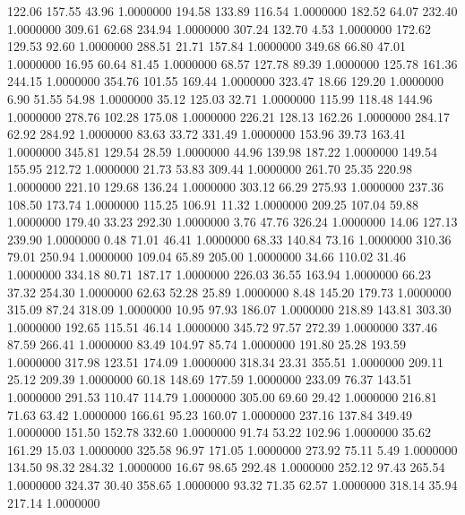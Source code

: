  122.06  157.55   43.96   1.0000000
 194.58  133.89  116.54   1.0000000
 182.52   64.07  232.40   1.0000000
 309.61   62.68  234.94   1.0000000
 307.24  132.70    4.53   1.0000000
 172.62  129.53   92.60   1.0000000
 288.51   21.71  157.84   1.0000000
 349.68   66.80   47.01   1.0000000
  16.95   60.64   81.45   1.0000000
  68.57  127.78   89.39   1.0000000
 125.78  161.36  244.15   1.0000000
 354.76  101.55  169.44   1.0000000
 323.47   18.66  129.20   1.0000000
   6.90   51.55   54.98   1.0000000
  35.12  125.03   32.71   1.0000000
 115.99  118.48  144.96   1.0000000
 278.76  102.28  175.08   1.0000000
 226.21  128.13  162.26   1.0000000
 284.17   62.92  284.92   1.0000000
  83.63   33.72  331.49   1.0000000
 153.96   39.73  163.41   1.0000000
 345.81  129.54   28.59   1.0000000
  44.96  139.98  187.22   1.0000000
 149.54  155.95  212.72   1.0000000
  21.73   53.83  309.44   1.0000000
 261.70   25.35  220.98   1.0000000
 221.10  129.68  136.24   1.0000000
 303.12   66.29  275.93   1.0000000
 237.36  108.50  173.74   1.0000000
 115.25  106.91   11.32   1.0000000
 209.25  107.04   59.88   1.0000000
 179.40   33.23  292.30   1.0000000
   3.76   47.76  326.24   1.0000000
  14.06  127.13  239.90   1.0000000
   0.48   71.01   46.41   1.0000000
  68.33  140.84   73.16   1.0000000
 310.36   79.01  250.94   1.0000000
 109.04   65.89  205.00   1.0000000
  34.66  110.02   31.46   1.0000000
 334.18   80.71  187.17   1.0000000
 226.03   36.55  163.94   1.0000000
  66.23   37.32  254.30   1.0000000
  62.63   52.28   25.89   1.0000000
   8.48  145.20  179.73   1.0000000
 315.09   87.24  318.09   1.0000000
  10.95   97.93  186.07   1.0000000
 218.89  143.81  303.30   1.0000000
 192.65  115.51   46.14   1.0000000
 345.72   97.57  272.39   1.0000000
 337.46   87.59  266.41   1.0000000
  83.49  104.97   85.74   1.0000000
 191.80   25.28  193.59   1.0000000
 317.98  123.51  174.09   1.0000000
 318.34   23.31  355.51   1.0000000
 209.11   25.12  209.39   1.0000000
  60.18  148.69  177.59   1.0000000
 233.09   76.37  143.51   1.0000000
 291.53  110.47  114.79   1.0000000
 305.00   69.60   29.42   1.0000000
 216.81   71.63   63.42   1.0000000
 166.61   95.23  160.07   1.0000000
 237.16  137.84  349.49   1.0000000
 151.50  152.78  332.60   1.0000000
  91.74   53.22  102.96   1.0000000
  35.62  161.29   15.03   1.0000000
 325.58   96.97  171.05   1.0000000
 273.92   75.11    5.49   1.0000000
 134.50   98.32  284.32   1.0000000
  16.67   98.65  292.48   1.0000000
 252.12   97.43  265.54   1.0000000
 324.37   30.40  358.65   1.0000000
  93.32   71.35   62.57   1.0000000
 318.14   35.94  217.14   1.0000000
